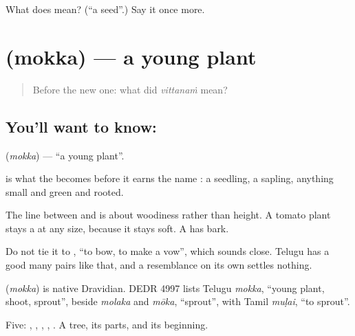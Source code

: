 \begin{tcolorbox}[breakable,colback=teal!4,colframe=teal!35!black,title={Before you move on}]
What does  mean? (\textquotedblleft{}a seed\textquotedblright{}.) Say it once more.
\end{tcolorbox}
\section[\texorpdfstring{\te{మొక్క} (mokka)}{మొక్క (mokka)}]{ (mokka) — a young plant}

\label{lesson:TE-C54-seedling}



\begin{quote}
Before the new one: what did \emph{vittanaṁ} mean?
\end{quote}

\subsection*{You'll want to know: }
\textbf{} (\emph{mokka}) — \textquotedblleft{}a young plant\textquotedblright{}.

 is what the  becomes before it earns the name : a seedling, a sapling, anything small and green and rooted.

The line between  and  is about woodiness rather than height. A tomato plant stays a  at any size, because it stays soft. A  has bark.

Do not tie it to , \textquotedblleft{}to bow, to make a vow\textquotedblright{}, which sounds close. Telugu has a good many pairs like that, and a resemblance on its own settles nothing.

\begin{cousinweb}
\textbf{} (\emph{mokka}) is native Dravidian. DEDR 4997 lists Telugu \emph{mokka}, \textquotedblleft{}young plant, shoot, sprout\textquotedblright{}, beside \emph{molaka} and \emph{mōka}, \textquotedblleft{}sprout\textquotedblright{}, with Tamil \emph{muḷai}, \textquotedblleft{}to sprout\textquotedblright{}.
\end{cousinweb}

\begin{grammarlens}[title={What you've built}]
Five: , , , , . A tree, its parts, and its beginning.
\end{grammarlens}

